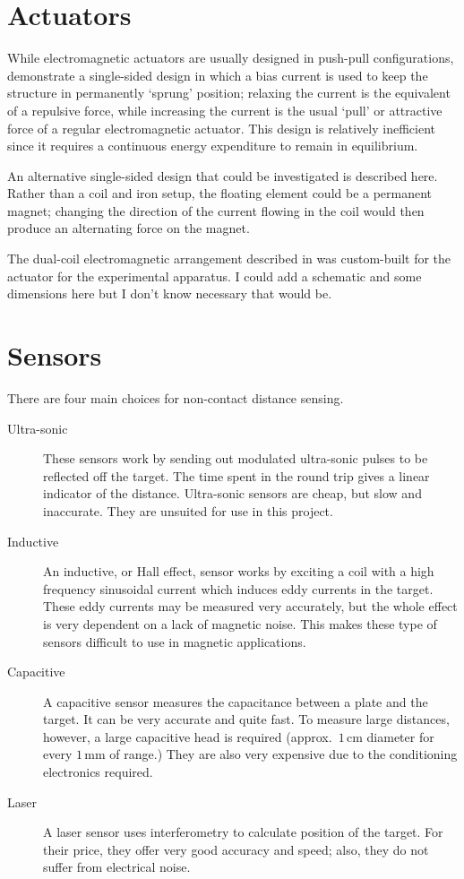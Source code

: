 \section{Actuators}

While electromagnetic actuators are usually designed in push-pull configurations,
\textcite{nandi2009} demonstrate a single-sided design in which a bias current
is used to keep the structure in permanently `sprung' position; relaxing the
current is the equivalent of a repulsive force, while increasing the current
is the usual `pull' or attractive force of a regular electromagnetic actuator.
This design is relatively inefficient since it requires a continuous energy
expenditure to remain in equilibrium.

An alternative single-sided design that could be investigated is described
here. Rather than a coil and iron setup, the floating element could be a
permanent magnet; changing the direction of the current flowing in the coil
would then produce an alternating force on the magnet.

The dual-coil electromagnetic arrangement described in  was
custom-built for the actuator for the experimental apparatus. I could add
a schematic and some dimensions here but I don't know necessary that would be.

\section{Sensors}

There are four main choices for non-contact distance sensing.
\begin{description}
\item[Ultra-sonic] 
    These sensors work by sending out modulated
    ultra-sonic pulses to be reflected off the target. The time spent
    in the round trip gives a linear indicator of the
    distance. Ultra-sonic sensors are cheap, but slow and
    inaccurate. They are unsuited for use in this project.
\item[Inductive] 
    An inductive, or Hall effect, sensor works by
    exciting a coil with a high frequency sinusoidal current which
    induces eddy currents in the target.  These eddy currents may be
    measured very accurately, but the whole effect is very dependent
    on a lack of magnetic noise. This makes these type of sensors
    difficult to use in magnetic applications.
\item[Capacitive] 
    A capacitive sensor measures the capacitance
    between a plate and the target.  It can be very accurate and quite
    fast. To measure large distances, however, a large capacitive head
    is required (approx.\ $1$\,cm diameter for every $1$\,mm of
    range.) They are also very expensive due to the conditioning
    electronics required.
\item[Laser] 
    A laser sensor uses interferometry to calculate position
    of the target. For their price, they offer very good accuracy and
    speed; also, they do not suffer from electrical noise.
\end{description}

